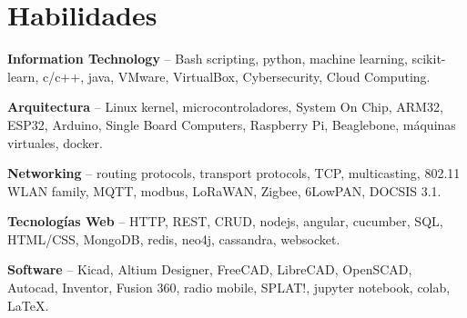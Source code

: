 \section{Habilidades}
\begin{small}
	\parbox[t][][t]{\linewidth}{
		\textbf{Information Technology} -- {Bash scripting, python, machine learning, 
		scikit-learn, c/c++, java, VMware, VirtualBox, Cybersecurity, Cloud Computing.}
		\bigbreak
	}
	\parbox[t][][t]{\linewidth}{
		\textbf{Arquitectura} -- {Linux kernel, 
		microcontroladores, System On Chip, 
		ARM32, ESP32, Arduino, Single Board Computers, Raspberry Pi, Beaglebone, 
		máquinas virtuales, docker.}
		\bigbreak
	}
	\parbox[t][][t]{\linewidth}{
		\textbf{Networking} -- {routing protocols, transport protocols, TCP,
		multicasting, 802.11 WLAN family, MQTT, modbus, LoRaWAN, Zigbee, 6LowPAN, DOCSIS 3.1.}
		\bigbreak
	}
	\parbox[t][][t]{\linewidth}{
		\textbf{Tecnologías Web} -- {HTTP, REST, CRUD, nodejs, angular, cucumber, 
		SQL, HTML/CSS, MongoDB, redis, neo4j, cassandra, websocket.}
		\bigbreak
	}
	\parbox[t][][t]{\linewidth}{
		\textbf{Software} -- {Kicad, Altium Designer, FreeCAD, 
		LibreCAD, OpenSCAD, Autocad, Inventor, Fusion 360, radio mobile, SPLAT!, jupyter notebook, colab,
		 \LaTeX.}
		\bigbreak
	}
\end{small}
